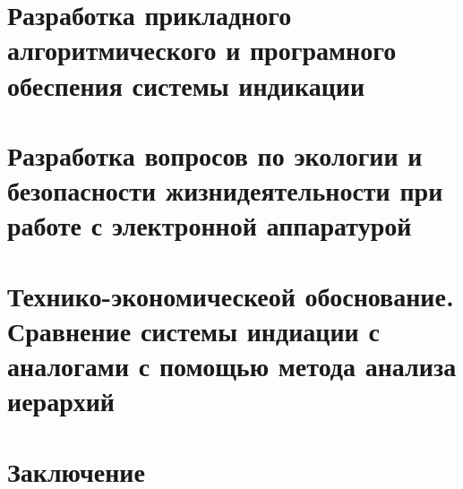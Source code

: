 \documentclass[a4paper,12pt]{report} %
\begin{document}
\section{Разработка прикладного алгоритмического и
 програмного обеспения  системы индикации} %
\lipsum [7]
\section{Разработка вопросов по экологии и безопасности жизнидеятельности при
  работе с электронной аппаратурой} %
\lipsum [1]
\section{Технико-экономическеой обоснование. Сравнение системы индиации с
  аналогами с помощью метода анализа иерархий} %
\lipsum [1]
\section{Заключение}
\end{document}

